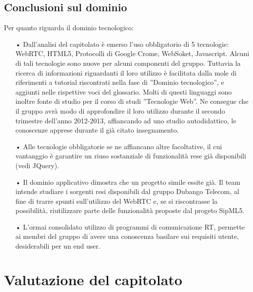 \subsection{Conclusioni sul dominio}
Per quanto riguarda il dominio tecnologico:
\begin{itemize}
	\item[•] Dall'analisi del capitolato è emerso l'uso obbligatorio di 5 tecnologie: WebRTC, HTML5, Protocolli di Google Crome, WebSoket, Javascript. Alcuni di tali tecnologie sono nuove per alcuni componenti del gruppo. Tuttavia la ricerca di informazioni riguardanti il loro utilizzo è facilitata dalla mole di riferimenti a tutorial riscontrati nella fase di ''Dominio tecnologico'', e aggiunti nelle rispettive voci del glossario. Molti di questi linguaggi sono inoltre fonte di studio per il corso di studi ''Tecnologie Web''. Ne consegue che il gruppo avrà modo di approfondire il loro utilizzo durante il secondo trimestre dell'anno 2012-2013, affiancando ad uno studio autodidattico, le conoscenze apprese durante il già citato insegnamento.
	\item[•] Alle tecnologie obbligatorie se ne affiancano altre facoltative, il cui vantanggio è garantire un riuso sostanziale di funzionalità rese già disponibili (vedi JQuery).
	\item[•] Il dominio applicativo dimostra che un progetto simile essite già. Il team intende studiare i sorgenti resi disponibili dal gruppo Dubango Telecom, al fine di trarre spunti sull'utilizzo del WebRTC e, se si riscontrasse la possibilità, riutilizzare parte delle funzionalità proposte dal progeto SipML5.
	\item[•] L'ormai consolidato utilizzo di programmi di comunicazione RT, permette ai membri del gruppo di avere una conoscenza basilare sui requisiti utente, desiderabili per un end user.
\end{itemize}

\section{Valutazione del capitolato}

